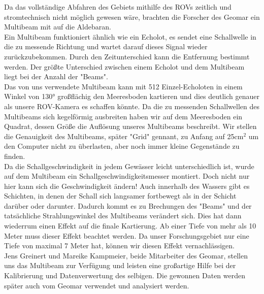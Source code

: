  

Da das vollständige Abfahren des Gebiets mithilfe des ROVs zeitlich und stromtechnisch nicht 
möglich gewesen wäre, brachten die Forscher des Geomar ein Multibeam mit auf die Aldebaran. \\

Ein Multibeam funktioniert ähnlich wie ein Echolot, es sendet eine Schallwelle in die zu messende 
Richtung und wartet darauf dieses Signal wieder zurückzubekommen. Durch den Zeitunterschied 
kann die Entfernung bestimmt werden. Der größte Unterschied zwischen einem Echolot und dem Multibeam 
liegt bei der Anzahl der "Beams". \\

Das von uns verwendete Multibeam kann mit 512 Einzel-Echoloten in einem Winkel von 130° großflächig den
Meeresboden kartieren und dies 
deutlich genauer als unsere ROV-Kamera es schaffen könnte. Da die zu messenden Schallwellen des Multibeams 
sich kegelförmig ausbreiten haben wir auf dem Meeresboden ein Quadrat, dessen Größe die Auflösung unseres Multibeams beschreibt.
Wir stellen die Genauigkeit des Multibeams, später "Grid" gennant, zu Anfang auf 25cm$^2$ um den Computer nicht zu überlasten, aber 
noch immer kleine Gegenstände zu finden.\\

Da die Schallgeschwindigkeit in jedem Gewässer leicht unterschiedlich ist, wurde auf dem Multibeam
ein Schallgeschwindigkeitsmesser montiert. Doch nicht nur hier kann sich die Geschwindigkeit ändern!
Auch innerhalb des Wassers gibt es Schichten, in denen der Schall sich langsamer fortbewegt als in
der Schicht darüber oder darunter. Dadurch kommt es zu Brechungen des "Beams" und der tatsächliche 
Strahlungswinkel des Multibeams verändert sich. Dies hat dann wiederrum einen Effekt auf die finale Kartierung.
Ab einer Tiefe von mehr als 10 Meter muss dieser Effekt beachtet werden. Da unser Forschungsgebiet nur eine 
Tiefe von maximal 7 Meter hat, können wir diesen Effekt vernachlässigen.\\

Jens Greinert und Mareike Kampmeier, beide Mitarbeiter des Geomar, stellen uns das Multibeam zur Verfügung und 
leisten eine großartige Hilfe bei der Kalibrierung und Datenverwertung des selbigen. Die gewonnen Daten werden 
später auch vom Geomar verwendet und analysiert werden. \\

